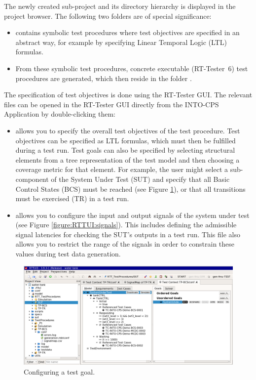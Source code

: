 %
%
%
The newly created sub-project and its directory hierarchy is displayed in the
project browser.
The following two folders are of special significance:
%
%
%
\begin{itemize}
    \item {} contains symbolic test procedures where test objectives
    are specified in an abstract way, for example by specifying Linear Temporal Logic (LTL) formulas.
    \item 
    From these symbolic test procedures, concrete executable ({RT-Tester~6}) test procedures
    are generated, which then reside in the folder .
\end{itemize}

The specification of test objectives is done using the RT-Tester GUI.
The relevant files can be opened in the RT-Tester GUI directly from the
INTO-CPS Application by double-clicking them:
%
%
%
\begin{itemize}
    \item {} allows you to specify the overall test objectives
      of the test procedure.
      Test objectives can be specified as LTL formulas, which must then be
      fulfilled during a test run.
      Test goals can also be specified by selecting structural elements from
      a tree representation of the test model and then choosing a coverage metric
      for that element. For example, the user might select a sub-component of
      the System Under Test (SUT) and specify that all Basic Control States (BCS) must be reached
      (see Figure \ref{figure:RTTUI:goals}),
      or that all transitions must be exercised (TR) in a test run.
    \item {} allows you to configure the input and output
      signals of the system under test (see Figure \ref{figure:RTTUI:signals}).
      This includes defining the admissible signal latencies for checking the SUT's outputs
      in a test run.
      This file also allows you to restrict the range of the signals in order to constrain
      these values during test data generation.
\end{itemize}
%
%
%
\begin{figure}[ht]
    \begin{center}
        \includegraphics[width=1.0\textwidth]{figures/VSI-TDG_sc-rttui-goals-bcs} 
    \end{center}
    \caption{Configuring a test goal.}
    \label{figure:RTTUI:goals}
\end{figure}

